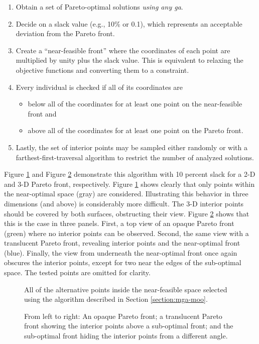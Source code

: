 \begin{enumerate}
    \item Obtain a set of Pareto-optimal solutions \textit{using any \ac{ga}}.
    \item Decide on a slack value (e.g., 10\% or 0.1), which represents an
    acceptable deviation from the Pareto front.
    \item Create a ``near-feasible front'' where the coordinates of each point
    are multiplied by unity plus the slack value. This is equivalent to relaxing
    the objective functions and converting them to a constraint. 
    \item Every individual is checked if all of its coordinates are
    \begin{itemize}
        \item below all of the coordinates for at least one point on the
        near-feasible front and
        \item above all of the coordinates for at least one point on the Pareto
        front.
    \end{itemize}  
    \item Lastly, the set of interior points may be sampled either randomly or with a
    farthest-first-traversal algorithm to restrict the number of analyzed solutions.
\end{enumerate}
\noindent
Figure \ref{fig:nd-mga} and Figure \ref{fig:3d-mga} demonstrate this algorithm
with 10 percent slack for a 2-D and 3-D Pareto front, respectively. Figure
\ref{fig:nd-mga} shows clearly that only points within the near-optimal space
(gray) are considered. Illustrating this behavior in three dimensions (and
above) is considerably more difficult. The 3-D interior points should be covered
by both surfaces, obstructing their view. Figure \ref{fig:3d-mga} shows that
this is the case in three panels. First, a top view of an opaque Pareto front
(green) where no interior points can be observed. Second, the same view with a
translucent Pareto front, revealing interior points and the near-optimal front
(blue). Finally, the view from underneath the near-optimal front once again
obscures the interior points, except for two near the edges of the sub-optimal
space. The tested points are omitted for clarity.
 

\begin{figure}[h]
  \centering
  \resizebox{0.6\columnwidth}{!}{}
  \caption{All of the alternative points inside the near-feasible space selected
  using the algorithm described in Section \ref{section:mga-moo}.}
  \label{fig:nd-mga}
\end{figure}

\begin{figure}[H]
  \centering
  \resizebox{1\columnwidth}{!}{}
  \caption{From left to right: An opaque Pareto front; a translucent Pareto front showing the interior points above a sub-optimal front; and the sub-optimal front hiding the interior points from a different angle.}
  \label{fig:3d-mga}
\end{figure}